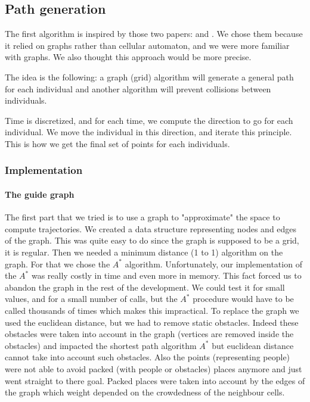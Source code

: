 \subsection{Path generation}

The first algorithm is inspired by those two papers: \cite{PLE} and
\cite{vandenBerg2011}. We chose them because it relied on graphs
rather than cellular automaton, and we were more familiar with
graphs. We also thought this approach would be more precise.


The idea is the following: a graph (grid) algorithm will generate a
general path for each individual and another algorithm will prevent
collisions between individuals.


Time is discretized, and for each time, we compute the direction to go
for each individual. We move the individual in this direction, and
iterate this principle. This is how we get the final set of points for
each individuals.


\subsubsection{Implementation}


\paragraph{The guide graph}

The first part that we tried is to use a graph to "approximate" the space to compute trajectories. We created a data structure representing nodes and edges of the
graph. This was quite easy to do since the graph is
supposed to be a grid, it is regular.  Then we needed a minimum
distance (1 to 1) algorithm on the graph. For that we chose the $A^*$
algorithm. Unfortunately, our implementation of the $A^*$ was really
costly in time and even more in memory. This fact forced us to abandon
the graph in the rest of the development. We could test it for small
values, and for a small number of calls, but the $A^*$ procedure would
have to be called thousands of times which makes this impractical.  To
replace the graph we used the euclidean distance, but we had to remove
static obstacles. Indeed these obstacles were taken into account in
the graph (vertices are removed inside the obstacles) and impacted the shortest
path algorithm $A^*$ but euclidean distance cannot take into account
such obstacles.  Also the points (representing people) were not able
to avoid packed (with people or obstacles) places anymore and just
went straight to there goal. Packed places were taken into account by
the edges of the graph which weight depended on the crowdedness of the
neighbour cells.

